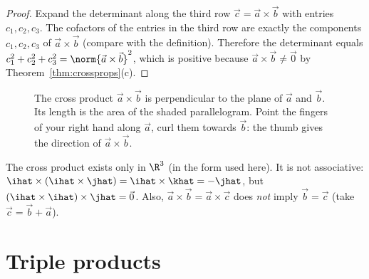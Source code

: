 \begin{proof}
Expand the determinant along the third row $\vec c=\vec a\times\vec b$ with entries $c_1,c_2,c_3$. The cofactors of the entries in the third row are exactly the components $c_1,c_2,c_3$ of $\vec a\times\vec b$ (compare with the definition). Therefore the determinant equals $c_1^2+c_2^2+c_3^2=\norm{\vec a\times\vec b}^2$, which is positive because $\vec a\times\vec b\neq\vec 0$ by Theorem~\ref{thm:crossprops}(c).
\end{proof}

\begin{figure}[ht]
\centering
{}
\caption{The cross product $\vec a\times\vec b$ is perpendicular to the plane of $\vec a$ and $\vec b$. Its length is the area of the shaded parallelogram. Point the fingers of your right hand along $\vec a$, curl them towards $\vec b$: the thumb gives the direction of $\vec a\times\vec b$.}
\label{fig:cross}
\end{figure}

\begin{pitfall}
The cross product exists only in $\R^3$ (in the form used here). It is not associative: $\ihat\times(\ihat\times\jhat)=\ihat\times\khat=-\jhat$, but $(\ihat\times\ihat)\times\jhat=\vec 0$. Also, $\vec a\times\vec b=\vec a\times\vec c$ does \emph{not} imply $\vec b=\vec c$ (take $\vec c=\vec b+\vec a$).
\end{pitfall}

\section{Triple products}

